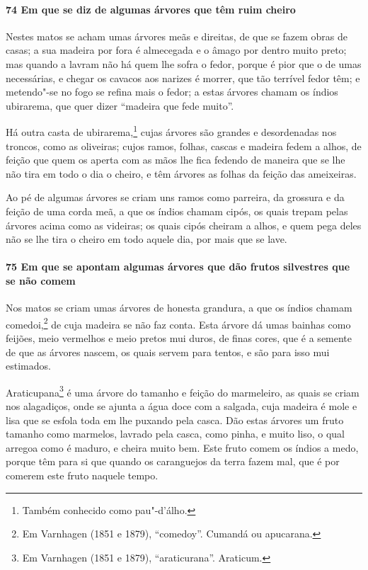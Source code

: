 \begin{linenumbers}
\paragraph{74 Em que se diz de algumas árvores que têm ruim cheiro}\quad
Nestes matos se acham umas árvores meãs e direitas, de que se fazem obras de casas; a sua
madeira por fora é almecegada e o âmago por dentro muito preto; mas quando a lavram não há
quem lhe sofra o fedor, porque é pior que o de umas necessárias, e chegar os cavacos aos
narizes é morrer, que tão terrível fedor têm; e metendo"-se no fogo se refina mais o fedor;
a estas árvores chamam os índios ubirarema, que quer dizer ``madeira que fede muito''.

Há outra casta de ubirarema,\footnote{ Também conhecido como pau"-d'álho.} cujas árvores
são grandes e desordenadas nos troncos, como as oliveiras; cujos ramos, folhas, cascas e
madeira fedem a alhos, de feição que quem os aperta com as mãos lhe fica fedendo de
maneira que se lhe não tira em todo o dia o cheiro, e têm árvores as folhas da feição das
ameixeiras.

Ao pé de algumas árvores se criam uns ramos como parreira, da grossura e da feição de uma
corda meã, a que os índios chamam cipós, os quais trepam pelas árvores acima como as
videiras; os quais cipós cheiram a alhos, e quem pega deles não se lhe tira o cheiro em
todo aquele dia, por mais que se lave.

\paragraph{75 Em que se apontam algumas árvores que dão frutos silvestres que se não
comem}\quad
Nos matos se criam umas árvores de honesta grandura, a que os índios chamam
comedoi,\footnote{ Em Varnhagen (1851 e 1879), ``comedoy''. Cumandá ou apucarana.} de cuja
madeira se não faz conta. Esta árvore dá umas bainhas como feijões, meio vermelhos e meio
pretos mui duros, de finas cores, que é a semente de que as árvores nascem, os quais
servem para tentos, e são para isso mui estimados.


Araticupana\footnote{ Em Varnhagen (1851 e 1879), ``araticurana''. Araticum.} é uma árvore
do tamanho e feição do marmeleiro, as quais se criam nos alagadiços, onde se ajunta a água
doce com a salgada, cuja madeira é mole e lisa que se esfola toda em lhe puxando pela
casca. Dão estas árvores um fruto tamanho como marmelos, lavrado pela casca, como pinha, e
muito liso, o qual arregoa como é maduro, e cheira muito bem. Este fruto comem os índios a
medo, porque têm para si que quando os caranguejos da terra fazem mal, que é por comerem
este fruto naquele tempo.


\end{linenumbers}
